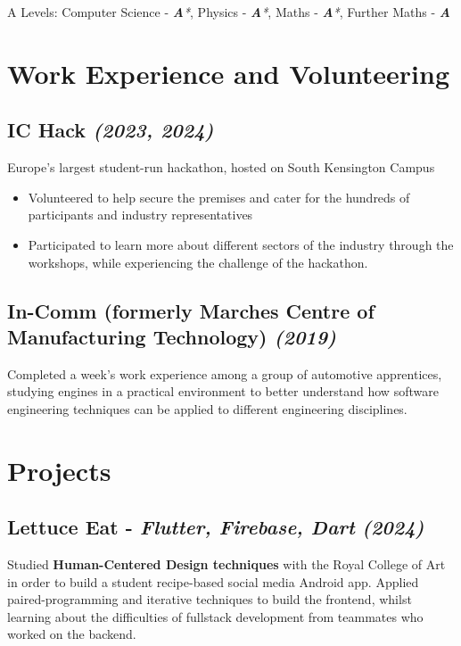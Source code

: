 \documentclass{article}
\newcommand{\dates}[1]{\hfill\textit{(#1)}}
\newcommand{\alevel}[2]{#1 - \textit{\textbf#2}}
\newcommand{\tab}{\hspace{1em}}
\newcommand{\project}[4]{
    \subsection*{\textbf{#1} - \textit{#3} \dates{#2}}\hfill
    \begin{minipage}{\dimexpr\textwidth - 1em}
        #4
    \end{minipage}
}
\begin{document}
{\tab}A Levels: 
    \alevel{Computer Science}{A*},
    \alevel{Physics}{A*},
    \alevel{Maths}{A*},
    \alevel{Further Maths}{A}



\section*{Work Experience and Volunteering}

\subsection*{\textbf{IC Hack} \dates{2023, 2024}}
{\tab}Europe's largest student-run hackathon, hosted on South Kensington Campus

\vspace{-0.75em} 
\begin{itemize}[noitemsep]
    \item Volunteered to help secure the premises and cater for the hundreds of participants and industry representatives
    \item Participated to learn more about different sectors of the industry through the workshops, 
    while experiencing the challenge of the hackathon.
\end{itemize}
\vspace{-0.75em} 


\subsection*{\textbf{In-Comm} (formerly Marches Centre of Manufacturing Technology) \dates{2019}}
{\tab}Completed a week's work experience among a group of automotive apprentices, studying engines in a practical environment to 
    better understand how software engineering techniques can be applied to different engineering disciplines.



\section*{Projects}

\project{Lettuce Eat }{2024}{Flutter, Firebase, Dart}{
    Studied \textbf{Human-Centered Design techniques} with the Royal College of Art in order to build a student recipe-based social media Android app.
    Applied paired-programming and iterative techniques to build the frontend, whilst learning about the difficulties of fullstack development
    from teammates who worked on the backend.
}
\end{document}
